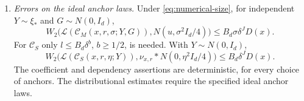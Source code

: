 \begin{theorem}
\begin{enumerate}[label=(\roman*),leftmargin=*]
\item \emph{Errors on the ideal anchor laws.}
Under \eqref{eq:numerical-size}, for independent
$Y\sim\xi_*$ and $G\sim N(0,I_d)$,
\begin{equation}\label{eq:ideal-mean-circuit-error}
 W_2\bigl(\mathcal L(\mathcal C_M(x,r,\sigma;Y,G)),
                  N(u,\sigma^2I_d/4)\bigr)
       \le B_d\sigma\delta^JD(x).
\end{equation}
For $\mathcal C_S$ only $l\le B_d\delta^b$, $b\ge1/2$, is needed.
With $Y\sim N(0,I_d)$,
\begin{equation}\label{eq:ideal-sample-circuit-error}
 W_2\bigl(\mathcal L(\mathcal C_S(x,r,\eta;Y)),
                    \nu_{x,r}*N(0,\eta^2I_d/4)\bigr)
       \le B_d\delta^JD(x).
\end{equation}
The coefficient and dependency assertions are deterministic, for every
choice of anchors.  The distributional estimates require the specified
ideal anchor laws.
\end{enumerate}
\end{theorem}

